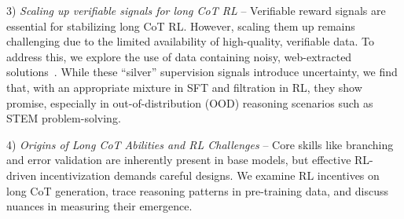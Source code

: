 3) \textit{Scaling up verifiable signals for long CoT RL} -- Verifiable reward signals are essential for stabilizing long CoT RL. However, scaling them up remains challenging due to the limited availability of high-quality, verifiable data. To address this, we explore the use of data containing noisy, web-extracted solutions~\cite{yue2024mammoth2}. While these ``silver'' supervision signals introduce uncertainty, we find that, with an appropriate mixture in SFT and filtration in RL, they show promise, especially in out-of-distribution (OOD) reasoning scenarios such as STEM problem-solving.

4) \textit{Origins of Long CoT Abilities and RL Challenges} – Core skills like branching and error validation are inherently present in base models, but effective RL-driven incentivization demands careful designs. We examine RL incentives on long CoT generation, trace reasoning patterns in pre-training data, and discuss nuances in measuring their emergence.
